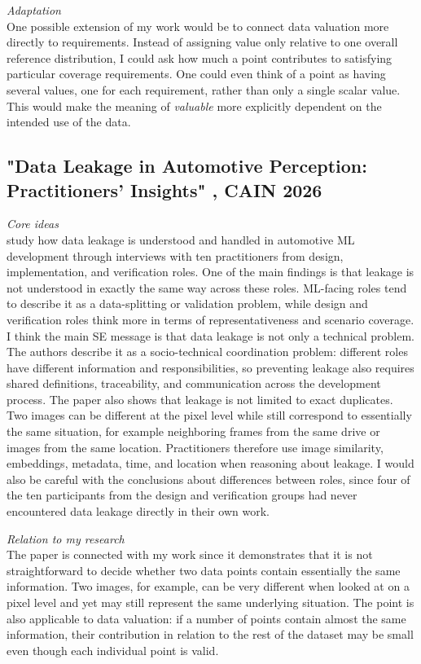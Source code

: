 \documentclass[11pt,a4paper]{article}
\newcommand{\heading}[1]{
  \vspace{.5em}
  \noindent\emph{#1}
}
\begin{document}
\heading{Adaptation}\\
One possible extension of my work would be to connect data valuation more directly to requirements. Instead of assigning value only relative to one overall reference distribution, I could ask how much a point contributes to satisfying particular coverage requirements. One could even think of a point as having several values, one for each requirement, rather than only a single scalar value. This would make the meaning of  \textit{valuable} more explicitly dependent on the intended use of the data.

\subsection{"Data Leakage in Automotive Perception: Practitioners’ Insights" \cite{babu2026data}, CAIN 2026} \label{paper:leakage}

\heading{Core ideas}\\
\citet{babu2026data} study how data leakage is understood and handled in automotive ML development through interviews with ten practitioners from design, implementation, and verification roles. One of the main findings is that leakage is not understood in exactly the same way across these roles. ML-facing roles tend to describe it as a data-splitting or validation problem, while design and verification roles think more in terms of representativeness and scenario coverage.
I think the main SE message is that data leakage is not only a technical problem. The authors describe it as a socio-technical coordination problem: different roles have different information and responsibilities, so preventing leakage also requires shared definitions, traceability, and communication across the development process.
The paper also shows that leakage is not limited to exact duplicates. Two images can be different at the pixel level while still correspond to essentially the same situation, for example neighboring frames from the same drive or images from the same location. Practitioners therefore use image similarity, embeddings, metadata, time, and location when reasoning about leakage. I would also be careful with the conclusions about differences between roles, since four of the ten participants from the design and verification groups had never encountered data leakage directly in their own work.

\heading{Relation to my research}\\
The paper is connected with my work since it demonstrates that it is not straightforward to decide whether two data points contain essentially the same information. Two images, for example, can be very different when looked at on a pixel level and yet may still represent the same underlying situation. The point is also applicable to data valuation: if a number of points contain almost the same information, their contribution in relation to the rest of the dataset may be small even though each individual point is valid.
\end{document}
